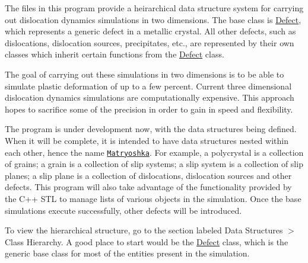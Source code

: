 The files in this program provide a heirarchical data structure system for carrying out dislocation dynamics simulations in two dimensions. The base class is \hyperlink{classDefect}{Defect}, which represents a generic defect in a metallic crystal. All other defects, such as dislocations, dislocation sources, precipitates, etc., are represented by their own classes which inherit certain functions from the \hyperlink{classDefect}{Defect} class.

The goal of carrying out these simulations in two dimensions is to be able to simulate plastic deformation of up to a few percent. Current three dimensional dislocation dynamics simulations are computationally expensive. This approach hopes to sacrifice some of the precision in order to gain in speed and flexibility.

The program is under development now, with the data structures being defined. When it will be complete, it is intended to have data structures nested within each other, hence the name \href{https://en.wikipedia.org/wiki/Matryoshka_doll}{\tt Matryoshka}. For example, a polycrystal is a collection of grains; a grain is a collection of slip systems; a slip system is a collection of slip planes; a slip plane is a collection of dislocations, dislocation sources and other defects. This program will also take advantage of the functionality provided by the C++ S\-T\-L to manage lists of various objects in the simulation. Once the base simulations execute successfully, other defects will be introduced.

To view the hierarchical structure, go to the section labeled Data Structures $>$ Class Hierarchy. A good place to start would be the \hyperlink{classDefect}{Defect} class, which is the generic base class for most of the entities present in the simulation. 